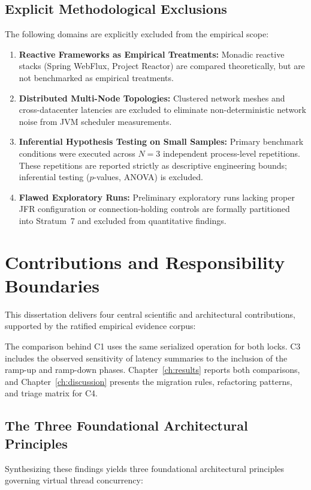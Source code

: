 \subsection{Explicit Methodological Exclusions}
The following domains are explicitly excluded from the empirical scope:
\begin{enumerate}
  \item \textbf{Reactive Frameworks as Empirical Treatments:} Monadic reactive stacks (Spring WebFlux, Project Reactor) are compared theoretically, but are not benchmarked as empirical treatments.
  \item \textbf{Distributed Multi-Node Topologies:} Clustered network meshes and cross-datacenter latencies are excluded to eliminate non-deterministic network noise from JVM scheduler measurements.
  \item \textbf{Inferential Hypothesis Testing on Small Samples:} Primary benchmark conditions were executed across $N=3$ independent process-level repetitions. These repetitions are reported strictly as descriptive engineering bounds; inferential testing ($p$-values, ANOVA) is excluded.
  \item \textbf{Flawed Exploratory Runs:} Preliminary exploratory runs lacking proper JFR configuration or connection-holding controls are formally partitioned into Stratum~7 and excluded from quantitative findings.
\end{enumerate}

\section{Contributions and Responsibility Boundaries}
\label{sec:contributions}

This dissertation delivers four central scientific and architectural contributions, supported by the ratified empirical evidence corpus:

\ContributionLedger

The comparison behind C1 uses the same serialized operation for both locks. C3 includes the observed sensitivity of latency summaries to the inclusion of the ramp-up and ramp-down phases. Chapter~\ref{ch:results} reports both comparisons, and Chapter~\ref{ch:discussion} presents the migration rules, refactoring patterns, and triage matrix for C4.

\subsection{The Three Foundational Architectural Principles}
Synthesizing these findings yields three foundational architectural principles governing virtual thread concurrency:

